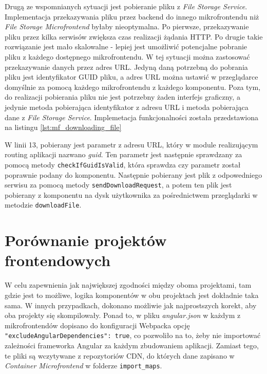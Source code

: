 \documentclass{SGGW-thesis}
\begin{document}
  Drugą ze wspomnianych sytuacji jest pobieranie pliku z \textit{File Storage Service}. Implementacja przekazywania pliku przez backend do innego mikrofrontendu niż \textit{File Storage Microfrontend} byłaby nieoptymalna. Po pierwsze, przekazywanie pliku przez kilka serwisów zwiększa czas realizacji żądania HTTP. Po drugie takie rozwiązanie jest mało skalowalne - lepiej jest umożliwić potencjalne pobranie pliku z każdego dostępnego mikrofrontendu. W tej sytuacji można zastosować przekazywanie danych przez adres URL. Jedyną daną potrzebną do pobrania pliku jest identyfikator GUID pliku, a adres URL można ustawić w przeglądarce domyślnie za pomocą każdego mikrofrontendu z każdego komponentu. Poza tym, do realizacji pobierania pliku nie jest potrzebny żaden interfejs graficzny, a jedynie metoda pobierająca identyfikator z adresu URL i metoda pobierająca dane z \textit{File Storage Service}. Implemetacja funkcjonalności została przedstawiona na listingu \cref{lst:mf_downloading_file}

  

  W linii 13, pobierany jest parametr z adresu URL, który w module realizującym routing aplikacji nazwano \textit{guid}. Ten parametr jest następnie sprawdzany za pomocą metody \lstinline{checkIfGuidIsValid}, która sprawdza czy parametr został poprawnie podany do komponentu. Następnie pobierany jest plik z odpowedniego serwisu za pomocą metody \lstinline{sendDownloadRequest}, a potem ten plik jest pobierany z komponentu na dysk użytkownika za pośrednictwem przeglądarki w metodzie \lstinline{downloadFile}.

\chapter{Porównanie projektów frontendowych}
  W celu zapewnienia jak największej zgodności między oboma projektami, tam gdzie jest to możliwe, logika komponentów w obu projektach jest dokładnie taka sama. W innych przypadkach, dokonano możliwie jak najprostszych korekt, aby oba projekty się skompilowały. Ponad to, w pliku \textit{angular.json} w każdym z mikrofrontendów dopisano do konfiguracji Webpacka opcję \lstinline{"excludeAngularDependencies": true}, co pozwoliło na to, żeby nie importować zależności frameworka Angular za każdym zbudowaniem aplikacji. Zamiast tego, te pliki są wczytywane z repozytoriów CDN, do których dane zapisano w \textit{Container Microfrontend} w folderze \lstinline{import_maps}.
\end{document}
